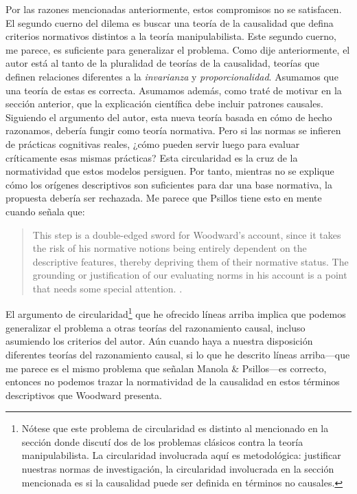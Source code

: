 Por las razones mencionadas anteriormente, estos compromisos
no se satisfacen. El segundo cuerno del dilema es buscar una
teoría de la causalidad que defina criterios normativos
distintos a la teoría manipulabilista. Este segundo cuerno,
me parece, es suficiente para generalizar el problema. Como
dije anteriormente, el autor está al tanto de la pluralidad
de teorías de la causalidad, teorías que definen relaciones
diferentes a la \emph{invarianza} y \emph{proporcionalidad}.
Asumamos que una teoría de estas es correcta. Asumamos
además, como traté de motivar en la sección anterior, que la
explicación científica debe incluir patrones causales.
Siguiendo el argumento del autor, esta nueva teoría basada
en cómo de hecho razonamos, debería fungir como teoría
normativa. Pero si las normas se infieren de prácticas
cognitivas reales, ¿cómo pueden servir luego para evaluar
críticamente esas mismas prácticas? Esta circularidad es la
cruz de la normatividad que estos modelos persiguen. Por
tanto, mientras no se explique cómo los orígenes
descriptivos son suficientes para dar una base normativa, la
propuesta debería ser rechazada. Me parece que Psillos tiene
esto en mente cuando señala que:

\begin{quote}
  This step is a double-edged sword for Woodward’s account,
  since it takes the risk of his normative notions being
  entirely dependent on the descriptive features, thereby
  depriving them of their normative status. The grounding or
  justification of our evaluating norms in his account is a
  point that needs some special attention.
  \parencite[p.~305]{Manola2023}.
\end{quote}

El argumento de circularidad\footnote{
  Nótese que este problema de circularidad es distinto al
  mencionado en la sección donde discutí dos de los
  problemas clásicos contra la teoría manipulabilista. La
  circularidad involucrada aquí es metodológica: justificar
  nuestras normas de  investigación, la circularidad
  involucrada en la sección mencionada es si la causalidad
  puede ser definida en términos no causales. 
} 
que he ofrecido líneas arriba implica que podemos
generalizar el problema a otras teorías del razonamiento
causal, incluso asumiendo los criterios del autor. Aún
cuando haya a nuestra disposición diferentes teorías del
razonamiento causal, si lo que he descrito líneas
arriba---que me parece es el mismo problema que señalan
Manola \& Psillos---es correcto, entonces no podemos trazar
la normatividad de la causalidad en estos términos
descriptivos que Woodward presenta. 

